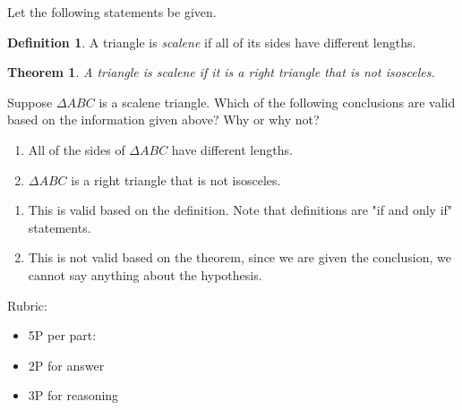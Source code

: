 \documentclass{article}
\newtheorem*{theorem}{Theorem}
\theoremstyle{definition}
\newtheorem*{definition}{Definition}
\begin{document}
\begin{question}
    Let the following statements be given. 
       \begin{definition}
          A triangle is \emph{scalene} if all of its sides have different lengths.
       \end{definition}
       \begin{theorem}
          A triangle is scalene if it is a right triangle that is not isosceles.
       \end{theorem}
    Suppose $\Delta ABC$ is a scalene triangle. 
    Which of the following conclusions are valid based on the information given above? 
    Why or why not?
    \begin{enumerate}
        \item All of the sides of $\Delta ABC$ have different lengths.
        \item $\Delta ABC$ is a right triangle that is not isosceles.
    \end{enumerate}
\end{question}
\begin{solution}
    \begin{enumerate}
        \item This is valid based on the definition. Note that definitions are "if and only if" statements.
        \item This is not valid based on the theorem, since we are given the conclusion, 
            we cannot say anything about the hypothesis.
    \end{enumerate}
    
{\color{red} Rubric:
\begin{itemize}
\item 5P per part:
\item 2P for answer
\item 3P for reasoning
\end{itemize}}
\end{solution}
\end{document}

